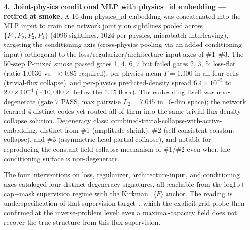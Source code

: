 \textbf{4.\ Joint-physics conditional MLP with physics\_id embedding --- retired at smoke.} A 16-dim physics\_id embedding was concatenated into the MLP input to train one network jointly on sightlines pooled across $\{P_1, P_2, P_3, P_4\}$ (4096 sightlines, 1024 per physics, microbatch interleaving), targeting the conditioning axis (cross-physics pooling via an added conditioning input) orthogonal to the loss/regularizer/architecture-input axes of \#1--\#3. The 50-step P-mixed smoke passed gates 1, 4, 6, 7 but failed gates 2, 3, 5: loss-flat (ratio $1.0036$ vs.\ $<0.85$ required), per-physics mean-$F\!=\!1.000$ in all four cells (trivial-flux collapse), and per-physics predicted-density spread $6.4\!\times\!10^{-5}$ to $2.0\!\times\!10^{-4}$ ($\sim\!10{,}000\times$ below the $1.45$ floor). The embedding itself was non-degenerate (gate 7 PASS, max pairwise $L_2 = 7.045$ in 16-dim space); the network learned 4 distinct codes yet routed all of them into the same trivial-flux density-collapse solution. Degeneracy class: combined-trivial-collapse-with-active-embedding, distinct from \#1 (amplitude-shrink), \#2 (self-consistent constant collapse), and \#3 (asymmetric-head partial collapse), and notable for reproducing the constant-field-collapse mechanism of \#1/\#2 even when the conditioning surface is non-degenerate.

The four interventions on loss, regularizer, architecture-input, and conditioning axes cataloged four distinct degeneracy signatures, all reachable from the log1p$+$cap$+$mask supervision regime with the Kirkman~\cite{kirkman2007} $\langle F\rangle$ anchor. The reading is underspecification of that supervision target~\cite{damour2020underspecification}, which the explicit-grid probe then confirmed at the inverse-problem level: even a maximal-capacity field does not recover the true structure from this flux supervision.

